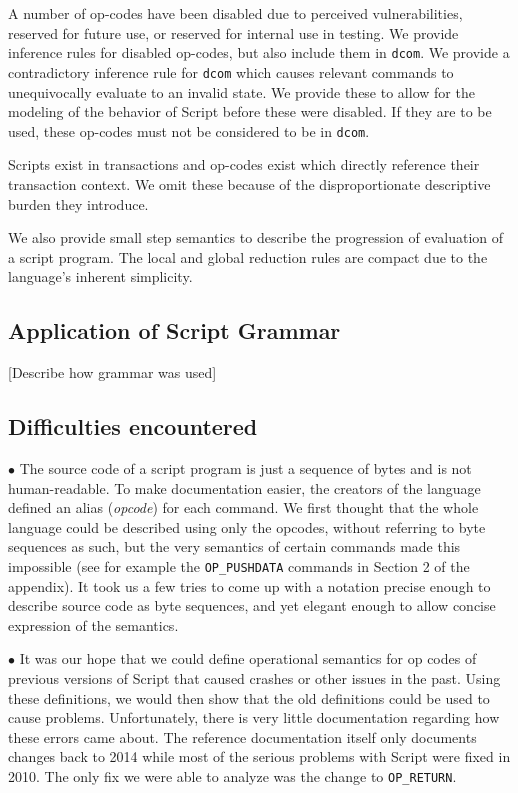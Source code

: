 \documentclass[letterpaper, 10 pt, conference]{ieeeconf}
\begin{document}
A number of op-codes have been disabled due to perceived vulnerabilities, reserved for future use, or reserved for internal use in testing. We provide inference rules for disabled op-codes, but also include them in \texttt{dcom}. We provide a contradictory inference rule for \texttt{dcom} which causes relevant commands to unequivocally evaluate to an invalid state. We provide these to allow for the modeling of the behavior of Script before these were disabled. If they are to be used, these op-codes must not be considered to be in \texttt{dcom}.

Scripts exist in transactions and op-codes exist which directly reference their transaction context. We omit these because of the disproportionate descriptive burden they introduce.

We also provide small step semantics to describe the progression of evaluation of a script program. The local and global reduction rules are compact due to the language's inherent simplicity.

\subsection{Application of Script Grammar}

[Describe how grammar was used]

\subsection{Difficulties encountered}

$\bullet$ The source code of a script program is just a sequence of bytes and is not human-readable. To make documentation easier, the creators of the language defined an alias (\textit{opcode}) for each command. We first thought that the whole language could be described using only the opcodes, without referring to byte sequences as such, but the very semantics of certain commands made this impossible (see for example the \texttt{OP\_PUSHDATA} commands in Section 2 of the appendix). It took us a few tries to come up with a notation precise enough to describe source code as byte sequences, and yet elegant enough to allow concise expression of the semantics.

$\bullet$ It was our hope that we could define operational semantics for op codes of previous versions of Script that caused crashes or other issues in the past.  Using these definitions, we would then show that the old definitions could be used to cause problems.  Unfortunately, there is very little documentation regarding how these errors came about.  The reference documentation itself only documents changes back to 2014 while most of the serious problems with Script were fixed in 2010. The only fix we were able to analyze was the change to \texttt{OP\_RETURN}.
\end{document}
